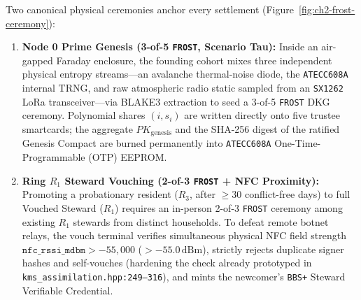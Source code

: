 Two canonical physical ceremonies anchor every settlement (Figure~\ref{fig:ch2-frost-ceremony}):
\begin{enumerate}
\item \textbf{Node 0 Prime Genesis (3-of-5 \texttt{FROST}, Scenario Tau):} Inside an air-gapped
        Faraday enclosure, the founding cohort mixes three independent physical entropy
        streams---an avalanche thermal-noise diode, the \texttt{ATECC608A} internal TRNG, and
        raw atmospheric radio static sampled from an \texttt{SX1262} LoRa transceiver---via
        BLAKE3 extraction to seed a 3-of-5 \texttt{FROST} DKG ceremony. Polynomial shares
        $(i, s_i)$ are written directly onto five trustee smartcards; the aggregate
        $PK_{\mathrm{genesis}}$ and the SHA-256 digest of the ratified Genesis Compact are
        burned permanently into \texttt{ATECC608A} One-Time-Programmable (OTP) EEPROM.
\item \textbf{Ring $R_1$ Steward Vouching (2-of-3 \texttt{FROST} + NFC Proximity):} Promoting a
        probationary resident ($R_3$, after $\ge 30$ conflict-free days) to full Vouched Steward
        ($R_1$) requires an in-person 2-of-3 \texttt{FROST} ceremony among existing $R_1$
        stewards from distinct households. To defeat remote botnet relays, the vouch terminal
        verifies simultaneous physical NFC field strength
        $\mathtt{nfc\_rssi\_mdbm} > -55{,}000$ ($>-55.0\,\mathrm{dBm}$), strictly rejects
        duplicate signer hashes and self-vouches (hardening the check already prototyped in
        \texttt{kms\_assimilation.hpp:249--316}), and mints the newcomer's \texttt{BBS+} Steward
        Verifiable Credential.
\end{enumerate}

